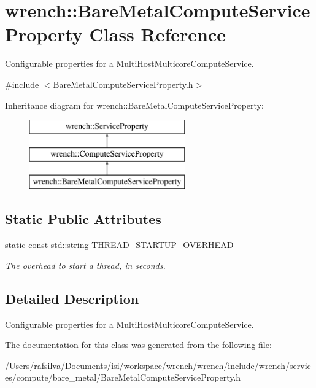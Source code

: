\hypertarget{classwrench_1_1_bare_metal_compute_service_property}{}\section{wrench\+:\+:Bare\+Metal\+Compute\+Service\+Property Class Reference}
\label{classwrench_1_1_bare_metal_compute_service_property}


Configurable properties for a Multi\+Host\+Multicore\+Compute\+Service.  




{\ttfamily \#include $<$Bare\+Metal\+Compute\+Service\+Property.\+h$>$}

Inheritance diagram for wrench\+:\+:Bare\+Metal\+Compute\+Service\+Property\+:\begin{figure}[H]
\begin{center}
\leavevmode
\includegraphics[height=3.000000cm]{classwrench_1_1_bare_metal_compute_service_property}
\end{center}
\end{figure}
\subsection*{Static Public Attributes}
\begin{DoxyCompactItemize}
\item 
\mbox{\label{classwrench_1_1_bare_metal_compute_service_property_a63dfaa7ebb4dc18d236c58384f14dd25}} 
static const std\+::string \hyperlink{classwrench_1_1_bare_metal_compute_service_property_a63dfaa7ebb4dc18d236c58384f14dd25}{T\+H\+R\+E\+A\+D\+\_\+\+S\+T\+A\+R\+T\+U\+P\+\_\+\+O\+V\+E\+R\+H\+E\+AD}
\begin{DoxyCompactList}\small\item\em The overhead to start a thread, in seconds. \end{DoxyCompactList}\end{DoxyCompactItemize}


\subsection{Detailed Description}
Configurable properties for a Multi\+Host\+Multicore\+Compute\+Service. 

The documentation for this class was generated from the following file\+:\begin{DoxyCompactItemize}
\item 
/\+Users/rafsilva/\+Documents/isi/workspace/wrench/wrench/include/wrench/services/compute/bare\+\_\+metal/Bare\+Metal\+Compute\+Service\+Property.\+h\end{DoxyCompactItemize}
